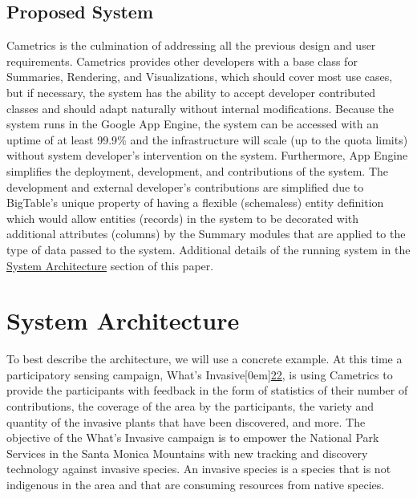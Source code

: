 \documentclass[10pt,a4paper,english]{article}
\begin{document}
\hypertarget{proposed-system}{}
\subsection*{Proposed System}
\label{proposed-system}

Cametrics is the culmination of addressing all the previous design and user requirements. Cametrics provides other developers with a base class for Summaries, Rendering, and Visualizations, which should cover most use cases, but if necessary, the system has the ability to accept developer contributed classes and should adapt naturally without internal modifications. Because the system runs in the Google App Engine, the system can be accessed with an uptime of at least 99.9{\%} and the infrastructure will scale (up to the quota limits) without system developer's intervention on the system. Furthermore, App Engine simplifies the deployment, development, and contributions of the system. The development and external developer's contributions are simplified due to BigTable's unique property of having a flexible (schemaless) entity definition which would allow entities (records) in the system to be decorated with additional attributes (columns) by the Summary modules that are applied to the type of data passed to the system. Additional details of the running system in the \href{\#system-architecture}{System Architecture} section of this paper.


\pagebreak{}




\hypertarget{system-architecture}{}
\section*{System Architecture}
\label{system-architecture}

To best describe the architecture, we will use a concrete example. At this time a participatory sensing campaign, What's Invasive\raisebox{.5em}[0em]{\scriptsize\hyperlink{id50}{22}}, is using Cametrics to provide the participants with feedback in the form of statistics of their number of contributions, the coverage of the area by the participants, the variety and quantity of the invasive plants that have been discovered, and more. The objective of the What's Invasive campaign is to empower the National Park Services in the Santa Monica Mountains with new tracking and discovery technology against invasive species. An invasive species is a species that is not indigenous in the area and that are consuming resources from native species.
\end{document}
